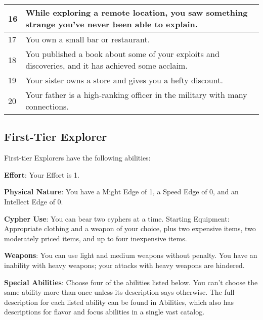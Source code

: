\begin{multicols}{2}
\begin{table*}
\begin{tabularx}{\textwidth}{| p{} | p{} |}
16 & While exploring a remote location, you saw something strange you’ve never been able to explain. \\ \hline
17 & You own a small bar or restaurant. \\ \hline
18 & You published a book about some of your exploits and discoveries, and it has achieved some acclaim. \\ \hline
19 & Your sister owns a store and gives you a hefty discount. \\ \hline
20 & Your father is a high-ranking officer in the military with many connections. \\ \hline

\end{tabularx}

\end{table*}

\subsection{First-Tier Explorer}

First-tier Explorers have the following abilities:

\textbf{Effort}: Your Effort is 1.

\textbf{Physical Nature}: You have a Might Edge of 1, a Speed Edge of 0, and an Intellect Edge of 0.

\textbf{Cypher Use}: You can bear two cyphers at a time.
Starting Equipment: Appropriate clothing and a weapon of your choice, plus two expensive items, two moderately priced items, and up to four inexpensive items.

\textbf{Weapons}: You can use light and medium weapons without penalty. You have an inability with heavy weapons; your attacks with heavy weapons are hindered.

\textbf{Special Abilities}: Choose four of the abilities listed below. You can’t choose the same ability more than once unless its description says otherwise. The full description for each listed ability can be found in Abilities, which also has descriptions for flavor and focus abilities in a single vast catalog.


\end{multicols}
